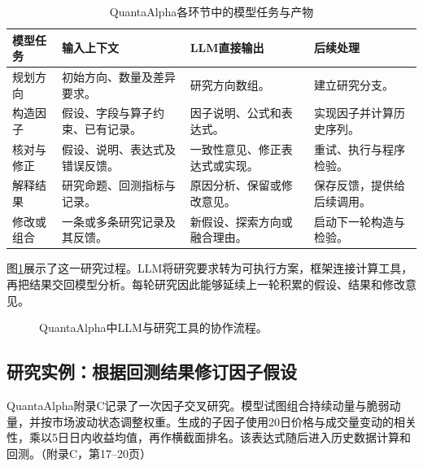 \documentclass[11pt,a4paper,fontset=none]{ctexart}
\begin{document}
\begin{table}[H]\small\centering
\caption{QuantaAlpha各环节中的模型任务与产物}
\begin{tabularx}{\linewidth}{@{}P{24mm}Y Y Y@{}}\toprule
模型任务 & 输入上下文 & LLM直接输出 & 后续处理\\\midrule
规划方向 & 初始方向、数量及差异要求。 & 研究方向数组。 & 建立研究分支。\\
构造因子 & 假设、字段与算子约束、已有记录。 & 因子说明、公式和表达式。 & 实现因子并计算历史序列。\\
核对与修正 & 假设、说明、表达式及错误反馈。 & 一致性意见、修正表达式或实现。 & 重试、执行与程序检验。\\
解释结果 & 研究命题、回测指标与记录。 & 原因分析、保留或修改意见。 & 保存反馈，提供给后续调用。\\
修改或组合 & 一条或多条研究记录及其反馈。 & 新假设、探索方向或融合理由。 & 启动下一轮构造与检验。\\\bottomrule
\end{tabularx}
\end{table}

图\ref{fig:llm-program}展示了这一研究过程。LLM将研究要求转为可执行方案，框架连接计算工具，再把结果交回模型分析。每轮研究因此能够延续上一轮积累的假设、结果和修改意见。

\begin{figure}[H]\centering
{}
\caption{QuantaAlpha中LLM与研究工具的协作流程。}\label{fig:llm-program}
\end{figure}

\subsection{研究实例：根据回测结果修订因子假设}
QuantaAlpha附录C记录了一次因子交叉研究。模型试图组合持续动量与脆弱动量，并按市场波动状态调整权重。生成的子因子使用20日价格与成交量变动的相关性，乘以5日日内收益均值，再作横截面排名。该表达式随后进入历史数据计算和回测。（附录C，第17--20页）
\end{document}
